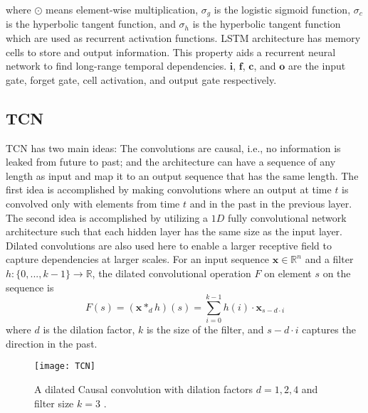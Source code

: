 \documentclass[12pt, A4]{article}
\begin{document}
where $\odot$ means element-wise multiplication, $\sigma_{g}$ is the logistic sigmoid function, $\sigma_{c}$ is the hyperbolic tangent function, and  $\sigma_{h}$ is the hyperbolic tangent function which are used as recurrent activation functions. LSTM architecture has memory cells to store and output information. This property aids a recurrent neural network to find long-range temporal dependencies. $\mathbf{i}$, $\mathbf{f}$, $\mathbf{c}$, and $\mathbf{o}$ are the input gate, forget gate, cell activation, and output gate respectively.

\subsection{TCN}
TCN has two main ideas: The convolutions are causal, i.e., no information is leaked from future to past; and the architecture can have a sequence of any length as input and map it to an output sequence that has the same length. The first idea is accomplished by making convolutions where an output at time $t$ is convolved only with elements from time $t$ and in the past in the previous layer. The second idea is accomplished by utilizing a $1D$ fully convolutional network architecture such that each hidden layer has the same size as the input layer. Dilated convolutions are also used here to enable a larger receptive field to capture dependencies at larger scales. For an input sequence $\mathbf{x} \in \mathbb{R}^{n}$ and a filter $h: \{0,...,k-1\} \rightarrow \mathbb{R}$, the dilated convolutional operation $F$ on element $s$ on the sequence is
\begin{equation}
	F(s) = (\mathbf{x} \ast_{d} h)(s) = \sum_{i=0}^{k-1}h(i)\cdot \mathbf{x}_{s-d\cdot i}
\end{equation}
where $d$ is the dilation factor, $k$ is the size of the filter, and $s-d\cdot i$ captures the direction in the past. \\

\begin{figure}[H]
	\centering
	\texttt{[image: TCN]}
	\caption{A dilated Causal convolution with dilation factors $d=1,2,4$ and filter size $k=3$ \cite{bai2018empirical}.}
	\label{TCN_arch}
\end{figure}
\end{document}
